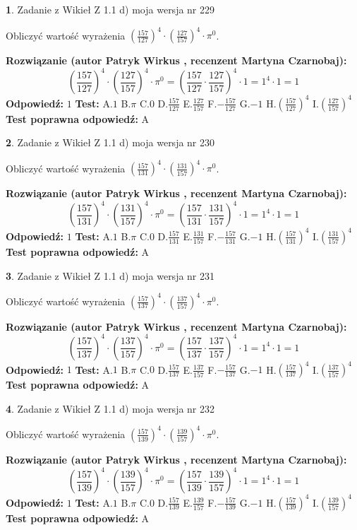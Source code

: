 \documentclass[12pt, a4paper]{article}
\theoremstyle{definition} %
\newtheorem{zad}{}
\newcommand{\zadStart}[1]{\begin{zad}#1\newline}
\newcommand{\zadStop}{\end{zad}}
\newcommand{\rozwStart}[2]{\noindent \textbf{Rozwiązanie (autor #1 , recenzent #2): }\newline}
\newcommand{\rozwStop}{\newline}
\newcommand{\odpStart}{\noindent \textbf{Odpowiedź:}\newline}
\newcommand{\odpStop}{\newline}
\newcommand{\testStart}{\noindent \textbf{Test:}\newline}
\newcommand{\testStop}{\newline}
\newcommand{\kluczStart}{\noindent \textbf{Test poprawna odpowiedź:}\newline}
\newcommand{\kluczStop}{\newline}
\begin{document}
\zadStart{Zadanie z Wikieł Z 1.1 d) moja wersja nr 229}

Obliczyć wartość wyrażenia $(\frac{157}{127})^{4} \cdot (\frac{127}{157})^{4} \cdot \pi^{0}$.
\zadStop
\rozwStart{Patryk Wirkus}{Martyna Czarnobaj}
$$(\frac{157}{127})^{4} \cdot (\frac{127}{157})^{4} \cdot \pi^{0} = (\frac{157}{127} \cdot \frac{127}{157})^{4} \cdot 1 = 1^{4} \cdot 1 = 1$$
\rozwStop
\odpStart
$1$
\odpStop
\testStart
A.$1$ B.$\pi$ C.$0$ D.$\frac{157}{127}$ E.$\frac{127}{157}$
F.$-\frac{157}{127}$ G.$-1$
H.$(\frac{157}{127})^{4}$
I.$(\frac{127}{157})^{4}$
\testStop
\kluczStart
A
\kluczStop



\zadStart{Zadanie z Wikieł Z 1.1 d) moja wersja nr 230}

Obliczyć wartość wyrażenia $(\frac{157}{131})^{4} \cdot (\frac{131}{157})^{4} \cdot \pi^{0}$.
\zadStop
\rozwStart{Patryk Wirkus}{Martyna Czarnobaj}
$$(\frac{157}{131})^{4} \cdot (\frac{131}{157})^{4} \cdot \pi^{0} = (\frac{157}{131} \cdot \frac{131}{157})^{4} \cdot 1 = 1^{4} \cdot 1 = 1$$
\rozwStop
\odpStart
$1$
\odpStop
\testStart
A.$1$ B.$\pi$ C.$0$ D.$\frac{157}{131}$ E.$\frac{131}{157}$
F.$-\frac{157}{131}$ G.$-1$
H.$(\frac{157}{131})^{4}$
I.$(\frac{131}{157})^{4}$
\testStop
\kluczStart
A
\kluczStop



\zadStart{Zadanie z Wikieł Z 1.1 d) moja wersja nr 231}

Obliczyć wartość wyrażenia $(\frac{157}{137})^{4} \cdot (\frac{137}{157})^{4} \cdot \pi^{0}$.
\zadStop
\rozwStart{Patryk Wirkus}{Martyna Czarnobaj}
$$(\frac{157}{137})^{4} \cdot (\frac{137}{157})^{4} \cdot \pi^{0} = (\frac{157}{137} \cdot \frac{137}{157})^{4} \cdot 1 = 1^{4} \cdot 1 = 1$$
\rozwStop
\odpStart
$1$
\odpStop
\testStart
A.$1$ B.$\pi$ C.$0$ D.$\frac{157}{137}$ E.$\frac{137}{157}$
F.$-\frac{157}{137}$ G.$-1$
H.$(\frac{157}{137})^{4}$
I.$(\frac{137}{157})^{4}$
\testStop
\kluczStart
A
\kluczStop



\zadStart{Zadanie z Wikieł Z 1.1 d) moja wersja nr 232}

Obliczyć wartość wyrażenia $(\frac{157}{139})^{4} \cdot (\frac{139}{157})^{4} \cdot \pi^{0}$.
\zadStop
\rozwStart{Patryk Wirkus}{Martyna Czarnobaj}
$$(\frac{157}{139})^{4} \cdot (\frac{139}{157})^{4} \cdot \pi^{0} = (\frac{157}{139} \cdot \frac{139}{157})^{4} \cdot 1 = 1^{4} \cdot 1 = 1$$
\rozwStop
\odpStart
$1$
\odpStop
\testStart
A.$1$ B.$\pi$ C.$0$ D.$\frac{157}{139}$ E.$\frac{139}{157}$
F.$-\frac{157}{139}$ G.$-1$
H.$(\frac{157}{139})^{4}$
I.$(\frac{139}{157})^{4}$
\testStop
\kluczStart
A
\kluczStop
\end{document}
